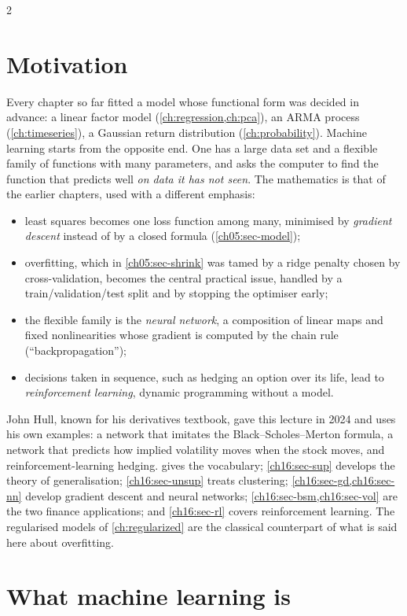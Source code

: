 \begin{paracol}{2}
\section*{Motivation}
Every chapter so far fitted a model whose functional form was decided in advance: a linear factor model
(\cref{ch:regression,ch:pca}), an ARMA process (\cref{ch:timeseries}), a Gaussian return distribution
(\cref{ch:probability}). Machine learning starts from the opposite end. One has a large data set and a flexible
family of functions with many parameters, and asks the computer to find the function that predicts well
\emph{on data it has not seen}. The mathematics is that of the earlier chapters, used with a different emphasis:
\begin{itemize}
  \item least squares becomes one loss function among many, minimised by \emph{gradient descent} instead of by a closed
        formula (\cref{ch05:sec-model});
  \item overfitting, which in \cref{ch05:sec-shrink} was tamed by a ridge penalty chosen by cross-validation, becomes the
        central practical issue, handled by a train/validation/test split and by stopping the optimiser early;
  \item the flexible family is the \emph{neural network}, a composition of linear maps and fixed nonlinearities whose
        gradient is computed by the chain rule (``backpropagation'');
  \item decisions taken in sequence, such as hedging an option over its life, lead to \emph{reinforcement learning},
        dynamic programming without a model.
\end{itemize}
John Hull, known for his derivatives textbook, gave this lecture in 2024 and uses his own examples: a network that
imitates the Black--Scholes--Merton formula, a network that predicts how implied volatility moves when the
stock moves, and reinforcement-learning hedging.  gives the vocabulary; \cref{ch16:sec-sup}
develops the theory of generalisation; \cref{ch16:sec-unsup} treats clustering; \cref{ch16:sec-gd,ch16:sec-nn}
develop gradient descent and neural networks; \cref{ch16:sec-bsm,ch16:sec-vol} are the two finance applications; and
\cref{ch16:sec-rl} covers reinforcement learning. The regularised models of \cref{ch:regularized} are the classical
counterpart of what is said here about overfitting.

\section{What machine learning is}\label{ch16:sec-what}

\end{paracol}
